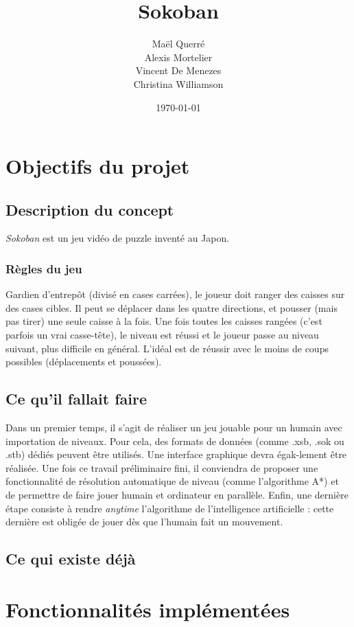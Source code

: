 \documentclass[a4paper, 11pt]{report}
\title{Sokoban}
\date{\today}
\author{Maël Querré\\
        Alexis Mortelier\\
        Vincent De Menezes\\
        Christina Williamson}
\makeatletter
\newcommand{\unicaen}{%
\begin{tikzpicture}
\fill [fill=logo] (-0.2,0) circle (4);
\draw[ligne] (-3,0.52) -- ++(0,-0.83); %
\coordinate (baseu) at (-3,-0.25);
\draw[ligne] (baseu) .. controls +(0,-0.4) and +(-0.1,-0.4) .. (-2.2,-0.28);
\draw[ligne] (-2.2,-0.35) -- ++(0,0.70) -- ++(-45:0.98)
                                                            -- ++(90:0.85);
\draw[cover] (-2.2,-0.52) ++(0,0.87) ++(0:-6.2pt) -- ++(-45:1.4); %
\draw[cover] (-1.51,0.27) node{\footnotesize$\blacksquare$}; %

\draw[ligne] (0.1,1.2) arc (90:270:1.2);
\draw[cover] (-1.1,0) node{\footnotesize$\blacksquare$}; %
\coordinate (triangletop) at (0,0.4);
\draw [ligne] (triangletop) -- ++(60:-1) -- ++(1,0)
                                                  -- ++(-60:-1) -- cycle;
\draw[cover] (triangletop) ++(0:-5pt) -- ++(-60:1.2); %
\draw[ligne] (0.8,0.45) -- ++(0.8,0);
\draw[ligne] (0.8,0) -- ++(0.8,0);
\draw[ligne] (0.8,-0.45) -- ++(0.8,0);
\draw[ligne] (2,-0.52) -- ++(0,0.87) -- ++(-45:0.98)
                                                            -- ++(90:0.85);
\draw[cover] (2,-0.52) ++(0,0.87) ++(0:-6pt) -- ++(-45:1.4); %
\end{tikzpicture}}
\def\@university{}
\def\@department{}
\def\@subject{}
\newcommand{\mytitle}{
  \begin{titlepage} %
  \hbox{
    \parbox[b]{.4\textwidth}{ %
      \resizebox{.3\textwidth}{!}{\unicaen}\\[1em]
      {\noindent\LARGE\textsc\@university}\\[1em] %
      {\noindent\@department} %
      \vskip.65\textheight %
    }
    \rule{1pt}{\textheight} %
    \hspace*{0.05\textwidth} %
    \parbox[b]{0.75\textwidth}{
      {\noindent\Huge\bfseries\@title} %
      \vskip 5em%
      {\large\textit{\@subject}} %
      \vskip 9em%
      \@author %
      \vskip 0.4\textheight %
      {\noindent\@date}\\[\baselineskip] %
    }
  }
  \end{titlepage}
}
\makeatother
\begin{document}
\mytitle

\tableofcontents


\chapter{Objectifs du projet}

\section{Description du concept}

\emph{Sokoban} est un jeu vidéo de puzzle inventé au Japon.

\subsection{Règles du jeu \cite{wiki:Sokoban}}

Gardien d'entrepôt (divisé en cases carrées), le joueur doit ranger des caisses sur des cases cibles. Il peut se déplacer dans les quatre directions, et pousser (mais pas tirer) une seule caisse à la fois. Une fois toutes les caisses rangées (c'est parfois un vrai casse-tête), le niveau est réussi et le joueur passe au niveau suivant, plus difficile en général. L'idéal est de réussir avec le moins de coups possibles (déplacements et poussées).

\section{Ce qu'il fallait faire}

Dans un premier temps, il s'agit de réaliser un jeu jouable pour un humain avec importation de niveaux. Pour cela, des formats de données (comme .xsb, .sok ou .stb) dédiés peuvent être utilisés. Une interface graphique devra égak-lement être réalisée. Une fois ce travail préliminaire fini, il conviendra de proposer une fonctionnalité de résolution automatique de niveau (comme l'algorithme A*) et de permettre de faire jouer humain et ordinateur en parallèle. Enfin, une dernière étape consiste à rendre \emph{anytime} l'algorithme de l'intelligence artificielle : cette dernière est obligée de jouer dès que l'humain fait un mouvement.

\section{Ce qui existe déjà}


\chapter{Fonctionnalités implémentées}
\end{document}
